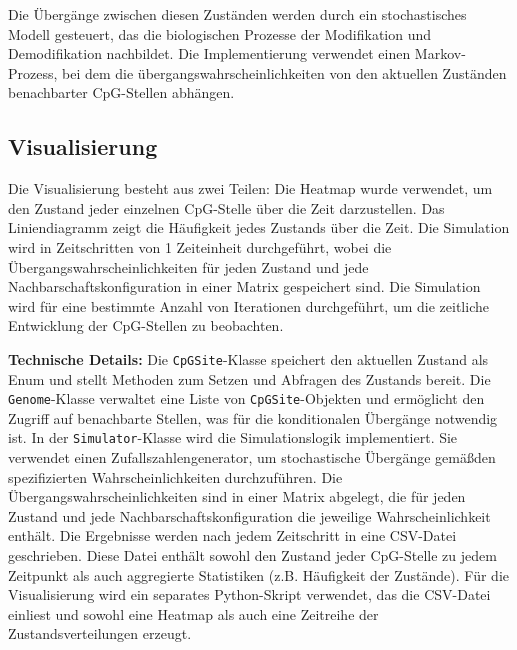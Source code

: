 \documentclass{SeminarV2}
\begin{document}
Die \"{U}berg\"{a}nge zwischen diesen Zust\"{a}nden 
werden durch ein stochastisches Modell gesteuert, das die 
biologischen Prozesse der Modifikation und Demodifikation nachbildet. 
Die Implementierung verwendet einen Markov-Prozess, bei dem die 
\"{u}bergangswahrscheinlichkeiten von den aktuellen Zust\"{a}nden benachbarter CpG-Stellen abh\"{a}ngen.

\subsection{Visualisierung}

Die Visualisierung besteht aus zwei Teilen: Die Heatmap wurde verwendet, um den Zustand jeder einzelnen CpG-Stelle \"{u}ber die Zeit darzustellen.
Das Liniendiagramm zeigt die H\"{a}ufigkeit jedes Zustands \"{u}ber die Zeit.
Die Simulation wird in Zeitschritten von 1 Zeiteinheit durchgef\"{u}hrt, wobei die \"{U}bergangswahrscheinlichkeiten f\"{u}r jeden Zustand und jede Nachbarschaftskonfiguration in einer Matrix gespeichert sind. Die Simulation wird f\"{u}r eine bestimmte Anzahl von Iterationen durchgef\"{u}hrt, um die zeitliche Entwicklung der CpG-Stellen zu beobachten.

\textbf{Technische Details:}
Die \texttt{CpGSite}-Klasse speichert den aktuellen Zustand als Enum und stellt Methoden zum Setzen und Abfragen des Zustands bereit.
Die \texttt{Genome}-Klasse verwaltet eine Liste von \texttt{CpGSite}-Objekten und erm\"{o}glicht den Zugriff auf benachbarte Stellen, was f\"{u}r die konditionalen \"{U}berg\"{a}nge notwendig ist.
In der \texttt{Simulator}-Klasse wird die Simulationslogik implementiert. Sie verwendet einen Zufallszahlengenerator, um stochastische \"{U}berg\"{a}nge gem\"{a}\ss den spezifizierten Wahrscheinlichkeiten durchzuf\"{u}hren. Die \"{U}bergangswahrscheinlichkeiten sind in einer Matrix abgelegt, die f\"{u}r jeden Zustand und jede Nachbarschaftskonfiguration die jeweilige Wahrscheinlichkeit enth\"{a}lt.
Die Ergebnisse werden nach jedem Zeitschritt in eine CSV-Datei geschrieben. Diese Datei enth\"{a}lt sowohl den Zustand jeder CpG-Stelle zu jedem Zeitpunkt als auch aggregierte Statistiken (z.B. H\"{a}ufigkeit der Zust\"{a}nde).
F\"{u}r die Visualisierung wird ein separates Python-Skript verwendet, das die CSV-Datei einliest und sowohl eine Heatmap als auch eine Zeitreihe der Zustandsverteilungen erzeugt.
\end{document}
